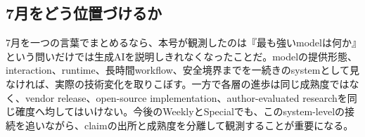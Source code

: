 \subsection*{7月をどう位置づけるか}
7月を一つの言葉でまとめるなら、本号が観測したのは『最も強いmodelは何か』という問いだけでは生成AIを説明しきれなくなったことだ。modelの提供形態、interaction、runtime、長時間workflow、安全境界までを一続きのsystemとして見なければ、実際の技術変化を取りこぼす。一方で各層の進歩は同じ成熟度ではなく、vendor release、open-source implementation、author-evaluated researchを同じ確度へ均してはいけない。今後のWeeklyとSpecialでも、このsystem-levelの接続を追いながら、claimの出所と成熟度を分離して観測することが重要になる。 \cite{src-dca7adc62d79,src-e19fbb75eb44,src-eb71f165025c,src-d8e13386974c,src-76c7b104c7df,src-b811cc97eff4,src-30d9d574d4a1,src-4141dfcd9b12,src-e08216aa168c,src-62c4ed3c6c14,src-0ebd2e2bdbb7,src-65271d0e1d0b,src-ab19992e4c80}
